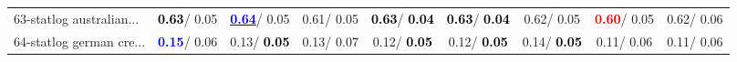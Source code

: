 \begin{table}[h]
\begin{center}
\begin{tabular}{lc|c|c|c|c|c|c|c}
63-statlog australian... & \textcolor{black}{\textbf{  0.63}}/  0.05 & \underline{\textcolor{blue}{\textbf{  0.64}}}/  0.05 &   0.61/  0.05 & \textcolor{black}{\textbf{  0.63}}/\textcolor{black}{\textbf{  0.04}} & \textcolor{black}{\textbf{  0.63}}/\textcolor{black}{\textbf{  0.04}} &   0.62/  0.05 & \textcolor{red}{\textbf{  0.60}}/  0.05 &   0.62/  0.06 \\
64-statlog german cre... & \textcolor{blue}{\textbf{  0.15}}/  0.06 &   0.13/\textcolor{black}{\textbf{  0.05}} &   0.13/  0.07 &   0.12/\textcolor{black}{\textbf{  0.05}} &   0.12/\textcolor{black}{\textbf{  0.05}} &   0.14/\textcolor{black}{\textbf{  0.05}} &   0.11/  0.06 &   0.11/  0.06 \\\end{tabular}\label{stratsALCKappa1bSVMRedux}
\end{center}
\end{table}

